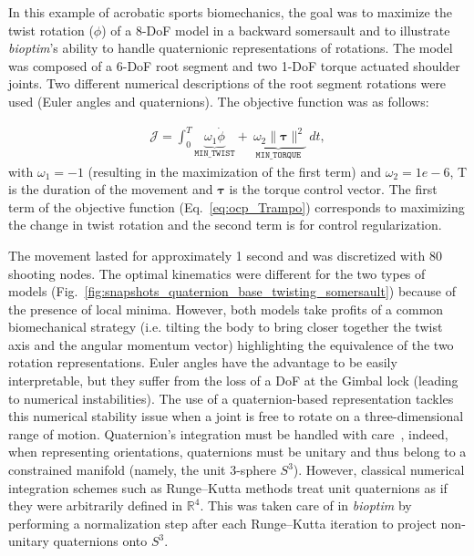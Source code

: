 In this example of acrobatic sports biomechanics, the goal was to maximize the twist rotation ($\phi$) of a 8-DoF model in a backward somersault and to illustrate \textit{bioptim}'s ability to handle quaternionic representations of rotations.
The model was composed of a 6-DoF root segment and two 1-DoF torque actuated shoulder joints.
Two different numerical descriptions of the root segment rotations were used (Euler angles and quaternions).
The objective function was as follows:

\begin{eqnarray}\label{eq:ocp_Trampo}
\mathcal{J} =  \int_0^T\underbrace{\omega_1 \dot{\phi}}_{\mathtt{MIN\_TWIST}}  + \underbrace{~\omega_2  \|\boldsymbol{\tau}\|^2}_{\mathtt{MIN\_ TORQUE}}~dt,
\end{eqnarray}
with $\omega_1 = -1$ (resulting in the maximization of the first term) and $\omega_2 = 1e-6$, T is the duration of the movement and $\boldsymbol{\tau}$ is the torque control vector.
The first term of the objective function (Eq.~\ref{eq:ocp_Trampo}) corresponds to maximizing the change in twist rotation and the second term is for control regularization.


The movement lasted for approximately 1 second and was discretized with 80 shooting nodes.
The optimal kinematics were different for the two types of models (Fig.~\ref{fig:snapshots_quaternion_base_twisting_somersault}) because of the presence of local minima.
However, both models take profits of a common biomechanical strategy (i.e. tilting the body to bring closer together the twist axis and the angular momentum vector) highlighting the equivalence of the two rotation representations.
Euler angles have the advantage to be easily interpretable, but they suffer from the loss of a DoF at the Gimbal lock (leading to numerical instabilities).
The use of a quaternion-based representation tackles this numerical stability issue when a joint is free to rotate on a three-dimensional range of motion.
Quaternion's integration must be handled with care~\cite{bailly2020optimal}, indeed, when representing orientations, quaternions must be unitary and thus belong to a constrained manifold (namely, the unit 3-sphere $S^3$). 
However, classical numerical integration schemes such as Runge–Kutta methods treat unit quaternions as if they were arbitrarily defined in $\mathbb{R}^4$.
This was taken care of in \textit{bioptim} by performing a normalization step after each Runge–Kutta iteration to project non-unitary quaternions onto $S^3$.



